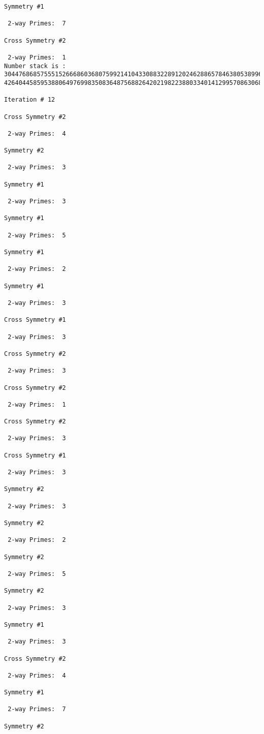 {{{{\begin{verbatim}
Symmetry #1

 2-way Primes: 	7

Cross Symmetry #2

 2-way Primes: 	1
Number stack is :
30447686857555152666860368075992141043308832289120246288657846380538996794608835958544046240163340857
42640445859538806497699835083648756882642021982238803340141299570863068666251555758686744037580433610

Iteration #	12

Cross Symmetry #2

 2-way Primes: 	4

Symmetry #2

 2-way Primes: 	3

Symmetry #1

 2-way Primes: 	3

Symmetry #1

 2-way Primes: 	5

Symmetry #1

 2-way Primes: 	2

Symmetry #1

 2-way Primes: 	3

Cross Symmetry #1

 2-way Primes: 	3

Cross Symmetry #2

 2-way Primes: 	3

Cross Symmetry #2

 2-way Primes: 	1

Cross Symmetry #2

 2-way Primes: 	3

Cross Symmetry #1

 2-way Primes: 	3

Symmetry #2

 2-way Primes: 	3

Symmetry #2

 2-way Primes: 	2

Symmetry #2

 2-way Primes: 	5

Symmetry #2

 2-way Primes: 	3

Symmetry #1

 2-way Primes: 	3

Cross Symmetry #2

 2-way Primes: 	4

Symmetry #1

 2-way Primes: 	7

Symmetry #2


\end{verbatim}}}}}
